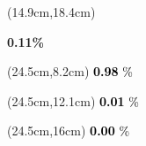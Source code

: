\documentclass[
  11pt,
  landscape]{article}
\begin{document}
\begin{textblock*}{5cm}(14.9cm,18.4cm) %
    \centerline{\textbf{0.11\%}}
\end{textblock*}

\begin{textblock*}{2.4cm}(24.5cm,8.2cm) %
  \huge \textcolor{black}{\textbf{0.98} \huge \%}
\end{textblock*}

\begin{textblock*}{2.4cm}(24.5cm,12.1cm) %
  \huge \textcolor{black}{\textbf{0.01} \huge \%}
\end{textblock*}

\begin{textblock*}{2.4cm}(24.5cm,16cm) %
  \huge \textcolor{black}{\textbf{0.00} \huge \%}
\end{textblock*}

\vspace{2.75em}
\end{document}
